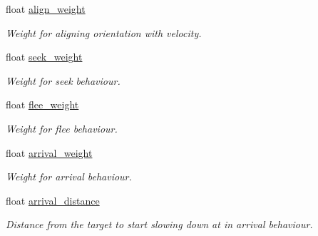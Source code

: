 \begin{DoxyCompactItemize}
float \hyperlink{classphysim_1_1particles_1_1agent__particle_a119da4916df4f5c52f13170725295f20}{align\+\_\+weight}
\begin{DoxyCompactList}\small\item\em Weight for aligning orientation with velocity. \end{DoxyCompactList}\item 
\mbox{\label{classphysim_1_1particles_1_1agent__particle_a853c72c7dbd902a126af1a90d50af222}} 
float \hyperlink{classphysim_1_1particles_1_1agent__particle_a853c72c7dbd902a126af1a90d50af222}{seek\+\_\+weight}
\begin{DoxyCompactList}\small\item\em Weight for seek behaviour. \end{DoxyCompactList}\item 
\mbox{\label{classphysim_1_1particles_1_1agent__particle_ad7824cd0742b42f803542d8b4d5eae98}} 
float \hyperlink{classphysim_1_1particles_1_1agent__particle_ad7824cd0742b42f803542d8b4d5eae98}{flee\+\_\+weight}
\begin{DoxyCompactList}\small\item\em Weight for flee behaviour. \end{DoxyCompactList}\item 
\mbox{\label{classphysim_1_1particles_1_1agent__particle_aaeb579f8b30b7604d7205bb7aff5197b}} 
float \hyperlink{classphysim_1_1particles_1_1agent__particle_aaeb579f8b30b7604d7205bb7aff5197b}{arrival\+\_\+weight}
\begin{DoxyCompactList}\small\item\em Weight for arrival behaviour. \end{DoxyCompactList}\item 
\mbox{\label{classphysim_1_1particles_1_1agent__particle_ab042fe6b2ee2ebb86bf0de7c23c09d04}} 
float \hyperlink{classphysim_1_1particles_1_1agent__particle_ab042fe6b2ee2ebb86bf0de7c23c09d04}{arrival\+\_\+distance}
\begin{DoxyCompactList}\small\item\em Distance from the target to start slowing down at in arrival behaviour. \end{DoxyCompactList}\item 

\end{DoxyCompactItemize}
